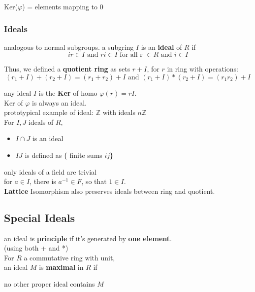 \documentclass[12pt]{article}
\begin{document}
Ker($\varphi$) = elements mapping to $0$

\subsubsection*{Ideals}
analogous to normal subgroups.
a subgring $I$ is an \textbf{ideal} of $R$ if 
$$ir \in I \text{ and } ri \in I \text{\  \ \  for all r } \in R \text{ and } i \in I$$

Thus, we defined a \textbf{quotient ring} as sets $r + I$, for $r$ in ring with operations:
$$(r_1 +I)+(r_2+I) = (r_1+r_2) + I \text{ and } (r_1 + I) * (r_2 + I) = (r_1r_2)+ I$$

any ideal $I$ is the \textbf{Ker} of homo $\varphi(r) = r I$. \\

Ker of $\varphi$ is always an ideal.\\

\hspace{10mm} prototypical example of ideal: $\mathbb{Z}$ with ideals $n\mathbb{Z}$\\

For $I, J$ ideals of $R$, 
\begin{itemize}
    \item $I \cap J$ is an ideal
    \item $IJ$ is defined as $\{$ finite sums $ij \}$
\end{itemize}

only ideals of a field are trivial \\
\indent \textcolor[gray]{0.5}{for $a \in I$, there is $a^{-1} \in F$, so that $1 \in I$.}\\

\textbf{Lattice} Isomorphism also preserves ideals between ring and quotient.

\subsection*{Special Ideals}

an ideal is \textbf{principle} if it's generated by \textbf{one element}.\\
\indent \hspace{70mm} (using both + and *)\\

For $R$ a commutative ring with unit, \\

an ideal $M$ is \textbf{maximal} in $R$ if \\
\centerline{no other proper ideal contains $M$}\\
\end{document}
